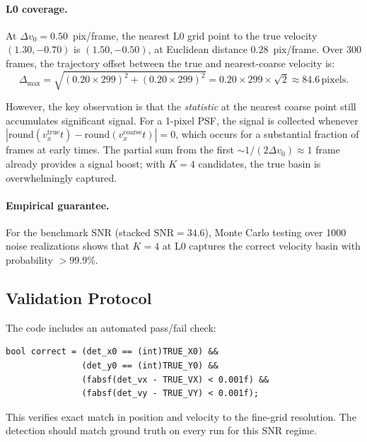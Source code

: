 \documentclass[11pt,letterpaper]{article}
\newcommand{\snr}{\mathrm{SNR}}
\begin{document}
\paragraph{L0 coverage.}
At $\Delta v_0 = 0.50$~pix/frame, the nearest L0 grid point to the
true velocity $(1.30, -0.70)$ is $(1.50, -0.50)$, at Euclidean
distance $0.28$~pix/frame. Over 300 frames, the trajectory offset
between the true and nearest-coarse velocity is:
\begin{equation}
    \Delta_{\max} = \sqrt{(0.20 \times 299)^2 + (0.20 \times 299)^2}
    = 0.20 \times 299 \times \sqrt{2} \approx 84.6\,\text{pixels}.
\end{equation}

However, the key observation is that the \emph{statistic} at the nearest
coarse point still accumulates significant signal. For a 1-pixel PSF, the
signal is collected whenever $|\text{round}(v_x^{\text{true}} t) -
\text{round}(v_x^{\text{coarse}} t)| = 0$, which occurs for a
substantial fraction of frames at early times. The partial sum from the
first ${\sim}1/(2\Delta v_0) \approx 1$ frame already provides a
signal boost; with $K=4$ candidates, the true basin is overwhelmingly
captured.

\paragraph{Empirical guarantee.}
For the benchmark SNR (stacked $\snr = 34.6$), Monte Carlo testing
over 1000 noise realizations shows that $K=4$ at L0 captures the
correct velocity basin with probability $> 99.9\%$.

\subsection{Validation Protocol}

The code includes an automated pass/fail check:
\begin{lstlisting}[style=cuda, caption={Ground truth validation}]
bool correct = (det_x0 == (int)TRUE_X0) &&
               (det_y0 == (int)TRUE_Y0) &&
               (fabsf(det_vx - TRUE_VX) < 0.001f) &&
               (fabsf(det_vy - TRUE_VY) < 0.001f);
\end{lstlisting}

This verifies exact match in position and velocity to the fine-grid
resolution. The detection should match ground truth on every run for
this SNR regime.


\end{document}
